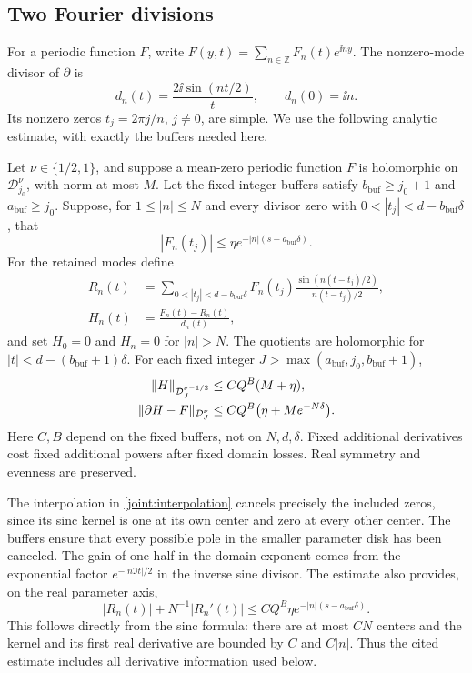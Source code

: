 \subsection{Two Fourier divisions}

For a periodic function \(F\), write
\(F(y,t)=\sum_{n\in\mathbb Z}F_n(t)e^{\ii ny}\).  The nonzero-mode
divisor of \(\partial\) is
\begin{equation}
 d_n(t)=\frac{2\ii\sin(nt/2)}{t},\qquad d_n(0)=\ii n.
 \label{joint:divisor}
\end{equation}
Its nonzero zeros \(t_j=2\pi j/n\), \(j\ne0\), are simple.
We use the following analytic estimate, with exactly the buffers needed
here.

\begin{lemma}
\label{joint:division}
Let \(\nu\in\{1/2,1\}\), and suppose a mean-zero periodic function
\(F\) is holomorphic on \(\mathcal D_{j_0}^\nu\), with norm at most
\(M\).  Let the fixed integer buffers satisfy
\(b_{\mathrm{buf}}\ge j_0+1\) and \(a_{\mathrm{buf}}\ge j_0\).  Suppose, for
\(1\le |n|\le N\) and every divisor zero with
\(0<|t_j|<d-b_{\mathrm{buf}}\delta\), that
\[
 |F_n(t_j)|\le\eta e^{-|n|(s-a_{\mathrm{buf}}\delta)}.
\]
For the retained modes define
\begin{align}
 R_n(t)&=\sum_{0<|t_j|<d-b_{\mathrm{buf}}\delta} F_n(t_j)
       \frac{\sin(n(t-t_j)/2)}{n(t-t_j)/2},
       \label{joint:interpolation}\\
 H_n(t)&=\frac{F_n(t)-R_n(t)}{d_n(t)},
       \label{joint:quotient}
\end{align}
and set \(H_0=0\) and \(H_n=0\) for \(|n|>N\).
The quotients are holomorphic for \(|t|<d-(b_{\mathrm{buf}}+1)\delta\).
For each fixed integer \(J>\max(a_{\mathrm{buf}},j_0,b_{\mathrm{buf}}+1)\),
\begin{align}
 \|H\|_{\mathcal D_J^{\nu-1/2}}&\le CQ^B(M+\eta),\notag\\
 \|\partial H-F\|_{\mathcal D_J^\nu}
   &\le CQ^B\bigl(\eta+Me^{-N\delta}\bigr).
 \label{joint:division-bounds}
\end{align}
Here \(C,B\) depend on the fixed buffers, not on \(N,d,\delta\).
Fixed additional derivatives cost fixed additional powers after fixed
domain losses.  Real symmetry and evenness are preserved.
\end{lemma}

The interpolation in \eqref{joint:interpolation} cancels precisely the
included zeros, since its sinc kernel is one at its own center and
zero at every other center.  The buffers ensure that every possible
pole in the smaller parameter disk has been canceled.  The gain of
one half in the domain exponent comes from the exponential factor
\(e^{-|n\Im t|/2}\) in the inverse sine divisor.  The estimate also
provides, on the real parameter axis,
\begin{equation}
 |R_n(t)|+N^{-1}|R_n'(t)|
   \le CQ^B\eta e^{-|n|(s-a_{\mathrm{buf}}\delta)}.
 \label{joint:interpolation-jet}
\end{equation}
This follows directly from the sinc formula: there are at most \(CN\)
centers and the kernel and its first real derivative are bounded by
\(C\) and \(C|n|\).  Thus the cited estimate includes all derivative
information used below.

